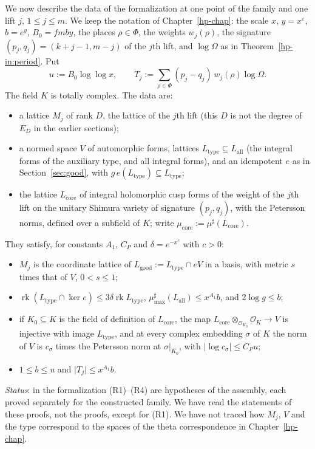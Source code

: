 \documentclass[reqno]{amsart}
\newcounter{chap}
\theoremstyle{definition}
\theoremstyle{plain}
\theoremstyle{remark}
\newcommand{\Oc}{\mathcal O}
\newcommand{\rk}{\operatorname{rk}}
\newcommand{\mus}{\mu^\sharp}
\newcommand{\musmax}{\mu^\sharp_{\max}}
\newcommand{\Lt}{L_{\mathrm{type}}}
\newcommand{\Lg}{L_{\mathrm{good}}}
\newcommand{\La}{L_{\mathrm{all}}}
\begin{document}
We now describe the data of the formalization at one point of the family and one lift \(j\), \(1 \le j \le m\).  We keep the notation of Chapter~\ref{hp-chap}: the scale \(x\), \(y = x^\varepsilon\), \(b = e^y\), \(B_0 = fmby\), the places \(\rho \in \Phi\), the weights \(w_j(\rho)\), the signature \((p_j, q_j) = (k+j-1, m-j)\) of the \(j\)th lift, and \(\log\Omega\) as in Theorem~\ref{hp-in:period}.  Put
\[
  u := B_0\log\log x , \qquad T_j := \sum_{\rho\in\Phi}(p_j - q_j)\,w_j(\rho)\log\Omega .
\]
The field \(K\) is totally complex.  The data are:
\begin{itemize}
\item a lattice \(M_j\) of rank \(D\), the lattice of the \(j\)th lift (this \(D\) is not the degree of \(E_D\) in the earlier sections);
\item a normed space \(V\) of automorphic forms, lattices \(\Lt \subseteq \La\) (the integral forms of the auxiliary type, and all integral forms), and an idempotent \(e\) as in Section~\ref{sec:good}, with \(g\,e(\Lt) \subseteq \Lt\);
\item the lattice \(L_{\mathrm{core}}\) of integral holomorphic cusp forms of the weight of the \(j\)th lift on the unitary Shimura variety of signature \((p_j, q_j)\), with the Petersson norms, defined over a subfield of \(K\); write \(\mu_{\mathrm{core}} := \mus(L_{\mathrm{core}})\).
\end{itemize}
They satisfy, for constants \(A_1\), \(C_P\) and \(\delta = e^{-x^c}\) with \(c > 0\):
\begin{itemize}
\item[(R1)] \(M_j\) is the coordinate lattice of \(\Lg := \Lt \cap eV\) in a basis, with metric \(s\) times that of \(V\), \(0 < s \le 1\);
\item[(R2)] \(\rk(\Lt \cap \ker e) \le 3\delta\rk\Lt\), \(\musmax(\La) \le x^{A_1}b\), and \(2\log g \le b\);
\item[(R3)] if \(K_0 \subseteq K\) is the field of definition of \(L_{\mathrm{core}}\), the map \(L_{\mathrm{core}} \otimes_{\Oc_{K_0}} \Oc_K \to V\) is injective with image \(\Lt\), and at every complex embedding \(\sigma\) of \(K\) the norm of \(V\) is \(c_\sigma\) times the Petersson norm at \(\sigma|_{K_0}\), with \(\lvert\log c_\sigma\rvert \le C_Pu\);
\item[(R4)] \(1 \le b \le u\) and \(\lvert T_j\rvert \le x^{A_1}b\).
\end{itemize}
\emph{Status}: in the formalization (R1)--(R4) are hypotheses of the assembly, each proved separately for the constructed family.  We have read the statements of these proofs, not the proofs, except for (R1).  We have not traced how \(M_j\), \(V\) and the type correspond to the spaces of the theta correspondence in Chapter~\ref{hp-chap}.
\end{document}
